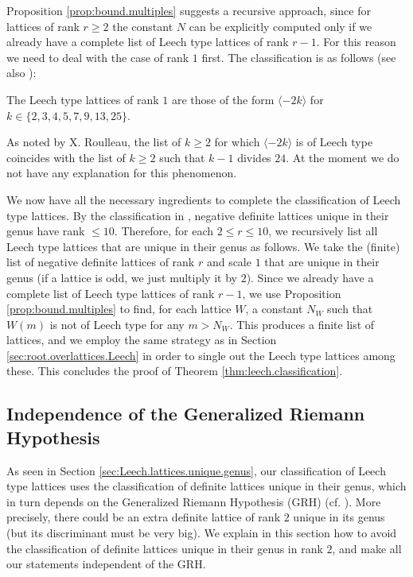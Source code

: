 \documentclass[11pt,letterpaper]{amsart}
\begin{document}
Proposition \ref{prop:bound.multiples} suggests a recursive approach, since for lattices of rank $r\ge 2$ the constant $N$ can be explicitly computed only if we already have a complete list of Leech type lattices of rank $r-1$. For this reason we need to deal with the case of rank $1$ first. The classification is as follows (see also \cite[Theorem~5.10]{mezzedimi.entropy}):

\begin{proposition}
The Leech type lattices of rank $1$ are those of the form $\langle -2k\rangle$ for $k\in \{2,3,4,5,7,9,13,25\}$.
\end{proposition}

\begin{remark}
As noted by X. Roulleau, the list of $k\ge 2$ for which $\langle -2k\rangle$ is of Leech type coincides with the list of $k\ge 2$ such that $k-1$ divides $24$. At the moment we do not have any explanation for this phenomenon.
\end{remark}

We now have all the necessary ingredients to complete the classification of Leech type lattices. By the classification in \cite{lorch.kirschmer.single.class}, negative definite lattices unique in their genus have rank $\le 10$. Therefore, for each $2\le r \le 10$, we recursively list all Leech type lattices that are unique in their genus as follows.
We take the (finite) list of negative definite lattices of rank $r$ and scale $1$ that are unique in their genus (if a lattice is odd, we just multiply it by $2$). Since we already have a complete list of Leech type lattices of rank $r-1$, we use Proposition \ref{prop:bound.multiples} to find, for each lattice $W$, a constant $N_W$ such that $W(m)$ is not of Leech type for any $m> N_W$. This produces a finite list of lattices, and we employ the same strategy as in Section \ref{sec:root.overlattices.Leech} in order to single out the Leech type lattices among these.
This concludes the proof of Theorem \ref{thm:leech.classification}.

\subsection{Independence of the Generalized Riemann Hypothesis} \label{sec:GRH}

As seen in Section \ref{sec:Leech.lattices.unique.genus}, our classification of Leech type lattices uses the classification of definite lattices unique in their genus, which in turn depends on the Generalized Riemann Hypothesis (GRH) (cf. \cite{voight}). More precisely, there could be an extra definite lattice of rank $2$ unique in its genus (but its discriminant must be very big).
We explain in this section how to avoid the classification of definite lattices unique in their genus in rank $2$, and make all our statements independent of the GRH.
\end{document}
